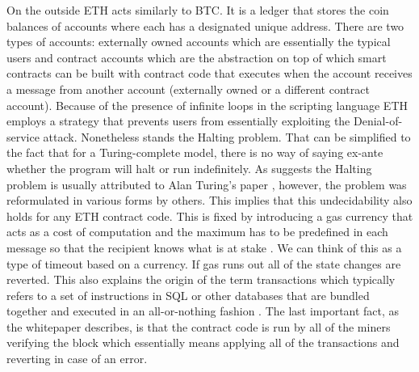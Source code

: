 On the outside \ac{ETH} acts similarly to \ac{BTC}. It is a ledger
that stores the coin balances of accounts where each has a designated unique address.
There are two types of accounts: externally owned accounts which are essentially
the typical users and contract accounts which are the abstraction on top of which
smart contracts can be built with contract code that executes when the account receives
a message from another account (externally owned or a different contract account).
Because of the presence of infinite loops in the scripting language \ac{ETH} employs
a strategy that prevents users from essentially exploiting the Denial-of-service attack.
Nonetheless stands the Halting problem. That can be simplified to the fact
that for a Turing-complete model, there is no way of saying ex-ante whether the program will
halt or run indefinitely. As \cite{Lucas2021} suggests the Halting problem
is usually attributed to Alan Turing's paper 
\cite[On computable numbers, with an application to the Entscheidungsproblem]{turing1936computable},
however, the problem was reformulated in various forms by others. This implies
that this undecidability also holds for any \ac{ETH} contract code.
This is fixed by introducing a gas currency that acts as a cost of computation 
and the maximum has to be predefined in each 
message so that the recipient knows what is at stake \cite{buterin2013ethereum}. 
We can think of this as a type of timeout based on a currency. If gas runs
out all of the state changes are reverted. This also explains the origin 
of the term 
transactions which typically refers to a set of instructions in SQL or 
other databases that
are bundled together and executed in an all-or-nothing fashion \cite{Kleppmann2017}.
The last important fact, as the whitepaper describes, is that the contract code is run by
all of the miners verifying the block which essentially means applying all of the
transactions and reverting in case of an error.


